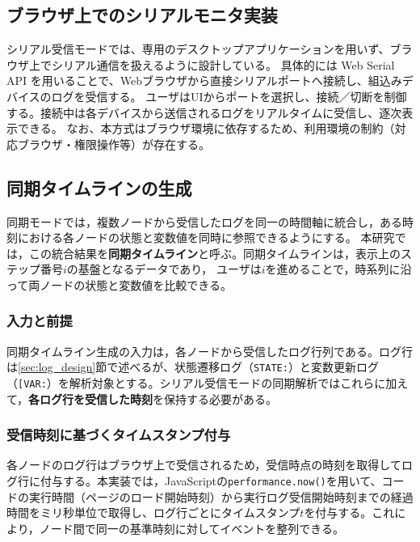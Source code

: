 \documentclass[12pt]{jreport}
\begin{document}
\subsection{ブラウザ上でのシリアルモニタ実装}
\label{sec:serial_monitor_impl}
\begin{par}
シリアル受信モードでは、専用のデスクトップアプリケーションを用いず、ブラウザ上でシリアル通信を扱えるように設計している。
具体的には Web Serial API を用いることで、Webブラウザから直接シリアルポートへ接続し、組込みデバイスのログを受信する。
ユーザはUIからポートを選択し、接続／切断を制御する。接続中は各デバイスから送信されるログをリアルタイムに受信し、逐次表示できる。
なお、本方式はブラウザ環境に依存するため、利用環境の制約（対応ブラウザ・権限操作等）が存在する。
\end{par}

\subsection{同期タイムラインの生成}
\label{sec:sync_timeline_build}

\begin{par}
同期モードでは，複数ノードから受信したログを同一の時間軸に統合し，ある時刻における各ノードの状態と変数値を同時に参照できるようにする。
本研究では，この統合結果を\textbf{同期タイムライン}と呼ぶ。同期タイムラインは，表示上のステップ番号$i$の基盤となるデータであり，
ユーザは$i$を進めることで，時系列に沿って両ノードの状態と変数値を比較できる。
\end{par}

\subsubsection{入力と前提}
\begin{par}
同期タイムライン生成の入力は，各ノードから受信したログ行列である。ログ行は\ref{sec:log_design}節で述べるが、状態遷移ログ（\texttt{STATE:}）と変数更新ログ（\texttt{[VAR:}）を解析対象とする。シリアル受信モードの同期解析ではこれらに加えて，\textbf{各ログ行を受信した時刻}を保持する必要がある。
\end{par}

\subsubsection{受信時刻に基づくタイムスタンプ付与}
\begin{par}
各ノードのログ行はブラウザ上で受信されるため，受信時点の時刻を取得してログ行に付与する。本実装では，JavaScriptの\texttt{performance.now()}を用いて、コードの実行時間（ページのロード開始時刻）から実行ログ受信開始時刻までの経過時間をミリ秒単位で取得し、ログ行ごとにタイムスタンプ$t$を付与する。これにより，ノード間で同一の基準時刻に対してイベントを整列できる。
\end{par}
\end{document}
